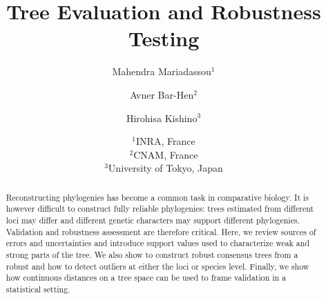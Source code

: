 \documentclass[a4paper,12pt]{article}
\title{Tree Evaluation and Robustness Testing}
\author{Mahendra Mariadassou$^1$ \and Avner Bar-Hen$^2$ \and Hirohisa Kishino$^3$}
\date{%
$^1$INRA, France\\%
$^2$CNAM, France\\%
$^3$University of Tokyo, Japan%
}
\begin{document}

\maketitle

\begin{abstract}
Reconstructing phylogenies has become a common task in comparative biology. It is however difficult to construct fully reliable phylogenies: trees estimated from different loci may differ and different genetic characters may support different phylogenies. Validation and robustness assessment are therefore critical. Here, we review sources of errors and uncertainties and introduce support values used to characterize weak and strong parts of the tree. We also show to construct robust consensus trees from a robust and how to detect outliers at either the loci or species level. Finally, we show how continuous distances on a tree space can be used to frame validation in a statistical setting.
\end{abstract}

\tableofcontents







% 





\end{document}
